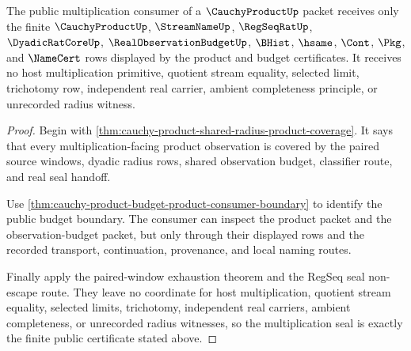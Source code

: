 \begin{theorem}
\label{thm:cauchy-product-real-seal-multiplication-nonescape}
The public multiplication consumer of a $\CauchyProductUp$ packet receives only the finite $\CauchyProductUp$, $\StreamNameUp$, $\RegSeqRatUp$, $\DyadicRatCoreUp$, $\RealObservationBudgetUp$, $\BHist$, $\hsame$, $\Cont$, $\Pkg$, and $\NameCert$ rows displayed by the product and budget certificates. It receives no host multiplication primitive, quotient stream equality, selected limit, trichotomy row, independent real carrier, ambient completeness principle, or unrecorded radius witness.
\end{theorem}
\begin{proof}
Begin with \autoref{thm:cauchy-product-shared-radius-product-coverage}. It says that every multiplication-facing product observation is covered by the paired source windows, dyadic radius rows, shared observation budget, classifier route, and real seal handoff.

Use \autoref{thm:cauchy-product-budget-product-consumer-boundary} to identify the public budget boundary. The consumer can inspect the product packet and the observation-budget packet, but only through their displayed rows and the recorded transport, continuation, provenance, and local naming routes.

Finally apply the paired-window exhaustion theorem and the RegSeq seal non-escape route. They leave no coordinate for host multiplication, quotient stream equality, selected limits, trichotomy, independent real carriers, ambient completeness, or unrecorded radius witnesses, so the multiplication seal is exactly the finite public certificate stated above.
\end{proof}

